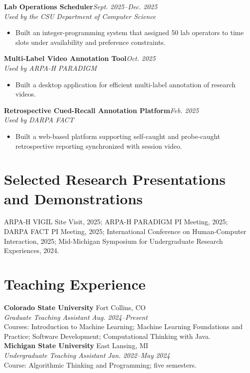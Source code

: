 \documentclass[9pt,letterpaper]{article}
\newcommand{\project}[3]{\textbf{#1}\hfill\textit{#3}\\\textit{#2}\vspace{-3pt}}
\begin{document}
\project{Lab Operations Scheduler}{Used by the CSU Department of Computer Science}{Sept. 2025--Dec. 2025}
\begin{itemize}
\item Built an integer-programming system that assigned 50 lab operators to time slots under availability and preference constraints.
\end{itemize}

\project{Multi-Label Video Annotation Tool}{Used by ARPA-H PARADIGM}{Oct. 2025}
\begin{itemize}
\item Built a desktop application for efficient multi-label annotation of research videos.
\end{itemize}

\project{Retrospective Cued-Recall Annotation Platform}{Used by DARPA FACT}{Feb. 2025}
\begin{itemize}
\item Built a web-based platform supporting self-caught and probe-caught retrospective reporting synchronized with session video.
\end{itemize}

\section{Selected Research Presentations and Demonstrations}
ARPA-H VIGIL Site Visit, 2025; ARPA-H PARADIGM PI Meeting, 2025; DARPA FACT PI Meeting, 2025; International Conference on Human-Computer Interaction, 2025; Mid-Michigan Symposium for Undergraduate Research Experiences, 2024.

\section{Teaching Experience}
\textbf{Colorado State University} \hfill Fort Collins, CO\\
\textit{Graduate Teaching Assistant} \hfill \textit{Aug. 2024--Present}\\[-2pt]
Courses: Introduction to Machine Learning; Machine Learning Foundations and Practice; Software Development; Computational Thinking with Java.\\[-1pt]
\textbf{Michigan State University} \hfill East Lansing, MI\\
\textit{Undergraduate Teaching Assistant} \hfill \textit{Jan. 2022--May 2024}\\[-2pt]
Course: Algorithmic Thinking and Programming; five semesters.
\end{document}
